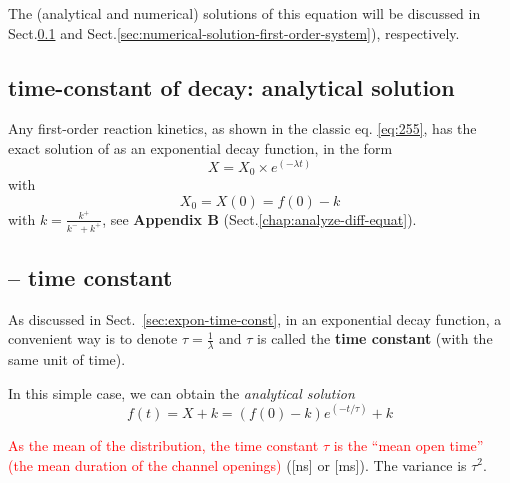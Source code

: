 The (analytical and numerical) solutions of this equation will be discussed in
Sect.\ref{sec:analytical-solution-first-order-system} and
Sect.\ref{sec:numerical-solution-first-order-system}), respectively.


\subsection{time-constant of decay: analytical solution }
\label{sec:analytical-solution-first-order-system}


Any first-order reaction kinetics, as shown in the classic eq. \eqref{eq:255},
has the exact solution of as an exponential decay function, in the form 
\begin{equation}
X = X_0 \times e^{({-\lambda t})}
\end{equation}
with
\begin{equation}
  \label{eq:256}
  X_0 = X(0)=f(0)-k
\end{equation}
with $k = \frac{k^+}{k^-+k^+}$, see {\bf Appendix B}
(Sect.\ref{chap:analyze-diff-equat}).

\subsection{-- time constant}
\label{sec:time-constant-example}

As discussed in Sect.~\ref{sec:expon-time-const}, in an exponential decay
function, a convenient way is to denote $\tau = \frac{1}{\lambda}$ and $\tau$ is
called the {\bf time constant} (with the same unit of time).

In this simple case, we can obtain the {\it analytical solution}
\begin{equation}
  \label{eq:14}
  f(t) = X + k = (f(0) - k) e^{({-t/\tau})} + k 
\end{equation}

\begin{framed}

  \textcolor{red}{As the mean of the distribution, the time constant
    $\tau$ is the ``mean open time'' (the mean duration of the channel
    openings)} ([ns] or [ms]). The variance is $\tau^2$.
\end{framed}

